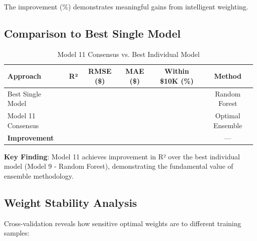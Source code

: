 The \ModelElevenImprovementOverEqual{} improvement (\ModelElevenImprovementPct{}\%) demonstrates meaningful gains from intelligent weighting.

\subsection{Comparison to Best Single Model}

\begin{table}[ht]
\centering
\caption{Model 11 Consensus vs. Best Individual Model}
\label{tab:model11_vs_best}
\begin{tabular}{lccccc}
\toprule
\textbf{Approach} & \textbf{R²} & \textbf{RMSE (\$)} & \textbf{MAE (\$)} & \textbf{Within \$10K (\%)} & \textbf{Method} \\
\midrule
Best Single Model & \ModelNineRSquaredTest{} & \ModelNineRMSETest{} & \ModelNineMAETest{} & \ModelNineWithinTenK{} & Random Forest \\
Model 11 Consensus & \ModelElevenRSquaredTest{} & \ModelElevenRMSETest{} & \ModelElevenMAETest{} & \ModelElevenWithinTenK{} & Optimal Ensemble \\
\midrule
\textbf{Improvement} & \textbf{\ModelElevenImprovementVsBest{}} & \textbf{\ModelElevenRMSEImprovementVsBest{}} & \textbf{\ModelElevenMAEImprovementVsBest{}} & \textbf{\ModelElevenAccuracyImprovementVsBest{}} & --- \\
\bottomrule
\end{tabular}
\end{table}

\textbf{Key Finding}: Model 11 achieves \ModelElevenImprovementVsBest{} improvement in R² over the best individual model (Model 9 - Random Forest), demonstrating the fundamental value of ensemble methodology.

\subsection{Weight Stability Analysis}

Cross-validation reveals how sensitive optimal weights are to different training samples:

